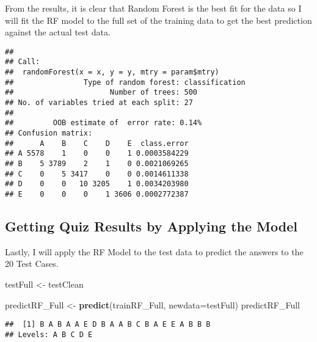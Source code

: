 \documentclass[]{article}
\newenvironment{Shaded}{\begin{snugshade}}{\end{snugshade}}
\newcommand{\DataTypeTok}[1]{\textcolor[rgb]{0.13,0.29,0.53}{#1}}
\newcommand{\DecValTok}[1]{\textcolor[rgb]{0.00,0.00,0.81}{#1}}
\newcommand{\KeywordTok}[1]{\textcolor[rgb]{0.13,0.29,0.53}{\textbf{#1}}}
\newcommand{\NormalTok}[1]{#1}
\newcommand{\OperatorTok}[1]{\textcolor[rgb]{0.81,0.36,0.00}{\textbf{#1}}}
\newcommand{\OtherTok}[1]{\textcolor[rgb]{0.56,0.35,0.01}{#1}}
\newcommand{\StringTok}[1]{\textcolor[rgb]{0.31,0.60,0.02}{#1}}
\begin{document}
From the results, it is clear that Random Forest is the best fit for the
data so I will fit the RF model to the full set of the training data to
get the best prediction against the actual test data.

\begin{Shaded}
\end{Shaded}

\begin{verbatim}
## 
## Call:
##  randomForest(x = x, y = y, mtry = param$mtry) 
##                Type of random forest: classification
##                      Number of trees: 500
## No. of variables tried at each split: 27
## 
##         OOB estimate of  error rate: 0.14%
## Confusion matrix:
##      A    B    C    D    E  class.error
## A 5578    1    0    0    1 0.0003584229
## B    5 3789    2    1    0 0.0021069265
## C    0    5 3417    0    0 0.0014611338
## D    0    0   10 3205    1 0.0034203980
## E    0    0    0    1 3606 0.0002772387
\end{verbatim}

\hypertarget{getting-quiz-results-by-applying-the-model}{%
\subsection{Getting Quiz Results by Applying the
Model}\label{getting-quiz-results-by-applying-the-model}}

Lastly, I will apply the RF Model to the test data to predict the
answers to the 20 Test Cases.

\begin{Shaded}
\begin{Highlighting}[]
\NormalTok{testFull <-}\StringTok{ }\NormalTok{testClean}

\NormalTok{predictRF_Full <-}\StringTok{ }\KeywordTok{predict}\NormalTok{(trainRF_Full, }\DataTypeTok{newdata=}\NormalTok{testFull)}
\NormalTok{predictRF_Full}
\end{Highlighting}
\end{Shaded}

\begin{verbatim}
##  [1] B A B A A E D B A A B C B A E E A B B B
## Levels: A B C D E
\end{verbatim}
\end{document}
